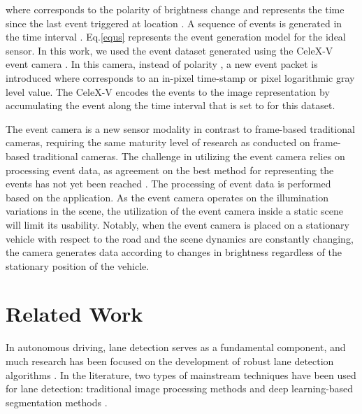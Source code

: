 \documentclass[journal]{IEEEtran}
\begin{document}
where  corresponds to the polarity of brightness change and  represents the time since the last event triggered at location . A sequence of events  is generated in the time interval . Eq.\ref{equs} represents the event generation model for the ideal sensor. In this work, we used the event dataset generated using the CeleX-V event camera \cite{r4}. In this camera, instead of polarity , a new event packet is introduced  where  corresponds to an in-pixel time-stamp or pixel logarithmic gray level value. The CeleX-V encodes the events to the image representation by accumulating the event along the time interval  that is set to  for this dataset.  
\par 
The event camera is a new sensor modality in contrast to frame-based traditional cameras, requiring the same maturity level of research as conducted on frame-based traditional cameras. The challenge in utilizing the event camera relies on processing event data, as agreement on the best method for representing the events has not yet been reached \cite{Gallego2019}\cite{r5}. The processing of event data is performed based on the application. As the event camera operates on the illumination variations in the scene, the utilization of the event camera inside a static scene will limit its usability. Notably, when the event camera is placed on a stationary vehicle with respect to the road and the scene dynamics are constantly changing, the camera generates data according to changes in brightness regardless of the stationary position of the vehicle.


\section{Related Work}
In autonomous driving, lane detection serves as a fundamental component, and much research has been focused on the development of robust lane detection algorithms \cite{Hillel2014}. In the literature, two types of mainstream techniques have been used for lane detection: traditional image processing methods and deep learning-based segmentation methods \cite{Aly2008} \cite{Wang2004} \cite{Huval2015}.
\par
\end{document}
